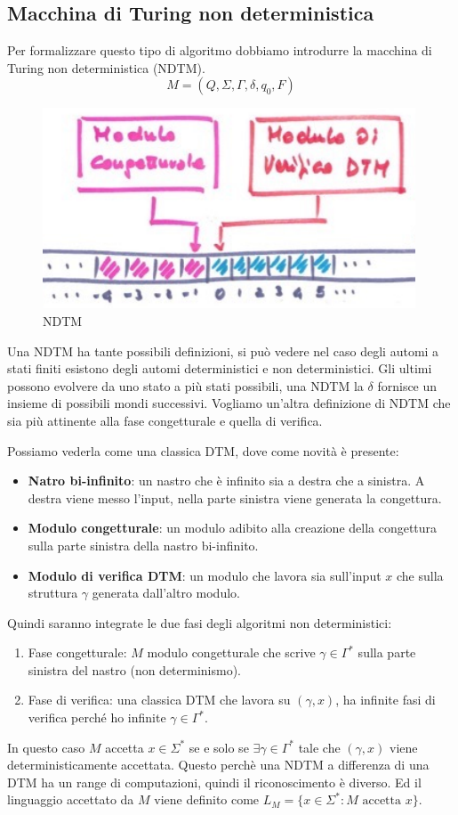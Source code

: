 \documentclass{article}
\begin{document}
\subsection{Macchina di Turing non deterministica}
Per formalizzare questo tipo di algoritmo dobbiamo introdurre la macchina di Turing
non deterministica (NDTM).
$$M=(Q,\Sigma,\Gamma,\delta,q_0,F)$$
\begin{figure}[H]
    \centering
    \includegraphics[scale=0.6]{images/ndtm.png}
    \caption{NDTM}
\end{figure}
Una NDTM ha tante possibili definizioni, si può vedere nel caso degli automi a stati finiti
esistono degli automi deterministici e non deterministici. Gli ultimi possono evolvere da uno
stato a più stati possibili, una NDTM la $\delta$ fornisce un insieme di possibili mondi
successivi. Vogliamo un'altra definizione di NDTM che sia più attinente alla fase
congetturale e quella di verifica.

Possiamo vederla come una classica DTM, dove come novità è presente:
\begin{itemize}
    \item \textbf{Natro bi-infinito}: un nastro che è infinito sia a destra
          che a sinistra. A destra viene messo l'input, nella parte sinistra viene
          generata la congettura.
    \item \textbf{Modulo congetturale}: un modulo adibito alla creazione
          della congettura sulla parte sinistra della nastro bi-infinito.
    \item \textbf{Modulo di verifica DTM}: un modulo che lavora sia sull'input $x$
          che sulla struttura $\gamma$ generata dall'altro modulo.
\end{itemize}
Quindi saranno integrate le due fasi degli algoritmi non deterministici:
\begin{enumerate}
    \item Fase congetturale: $M$ modulo congetturale che scrive $\gamma\in\Gamma^*$ sulla
          parte sinistra del nastro (non determinismo).
    \item Fase di verifica: una classica DTM che lavora su $(\gamma,x)$, ha infinite
          fasi di verifica perché ho infinite $\gamma\in\Gamma^*$.
\end{enumerate}
In questo caso $M$ accetta $x\in\Sigma^*$ se e solo se $\exists\gamma\in\Gamma^*$ tale
che $(\gamma,x)$ viene deterministicamente accettata.
Questo perchè una NDTM a differenza di una DTM ha un range di computazioni, quindi
il riconoscimento è diverso.
Ed il linguaggio accettato da $M$ viene definito come $L_M=\{x\in\Sigma^*:M\text{ accetta }x\}$.
\end{document}
